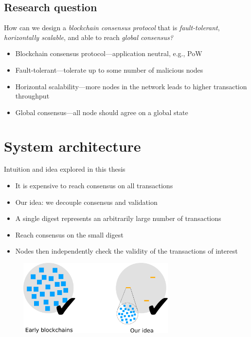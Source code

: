 \documentclass{beamer}
\begin{document}
\subsection{Research question}
\begin{frame}{\subsecname}
  \begin{block}{}
    \Large{
    How can we design a \emph{blockchain consensus protocol} that is \emph{fault-tolerant},
    \emph{horizontally scalable}, and able to reach \emph{global consensus?}
    }
  \end{block}
  \begin{itemize}
    \item Blockchain consensus protocol---application neutral, e.g., PoW
    \item Fault-tolerant---tolerate up to some number of malicious nodes
    \item Horizontal scalability---more nodes in the network leads to higher transaction throughput
    \item Global consensus---all node should agree on a global state
  \end{itemize}
\end{frame}

\section{System architecture}
\begin{frame}{Intuition and idea explored in this thesis}
  \begin{itemize}
    \item It is expensive to reach consensus on all transactions
    \item Our idea: we decouple consensus and validation
    \item A single digest represents an arbitrarily large number of transactions
    \item Reach consensus on the small digest
    \item Nodes then independently check the validity of the transactions of interest
  \end{itemize}
  \begin{figure}[h]
  \includegraphics[width=0.7\textwidth]{idea}
  \centering
  \end{figure}
\end{frame}
\end{document}
